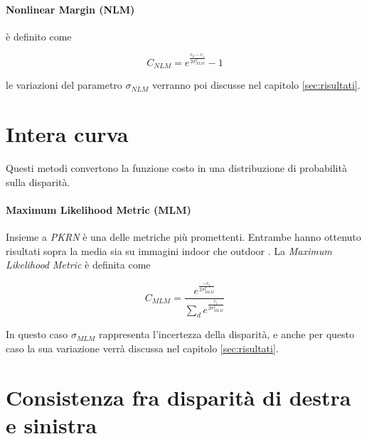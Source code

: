 \documentclass[12pt]{report}
\begin{document}
			
			\paragraph{Nonlinear Margin (NLM)}
			\label{par:NLM}
			
				è definito come
				
				\begin{equation}
					C_{NLM}= e^{ \frac{ c_{2}-c_{1}} {2\sigma_{NLM}^2}}-1
					\label{eq:NLM}
				\end{equation}
				
				\noindent le variazioni del parametro $\sigma_{NLM}$ verranno poi discusse nel capitolo \ref{sec:risultati}.
				
		\section{Intera curva}
		\label{sec:entireCost}
		
			Questi metodi convertono la funzione costo in una distribuzione di probabilità sulla disparità.
			
			\paragraph{Maximum Likelihood Metric (MLM)}
			\label{par:MLM}
			
				Insieme a \textit{PKRN} è una delle metriche più promettenti. Entrambe hanno ottenuto risultati sopra la media sia su immagini indoor che outdoor \cite{indoors_outdoors}.
				La \textit{Maximum Likelihood Metric} è definita come
				
				\begin{equation}
					C_{MLM}= \frac{e^\frac{-c_{1}}{2\sigma_{MLM}^2}}{\sum_{d} e^\frac{c_{i}}{2\sigma_{MLM}^2}}
					\label{eq:MLM}
				\end{equation}  	
			
				\noindent In questo caso $\sigma_{MLM}$ rappresenta l'incertezza della disparità, e anche per questo caso la sua variazione verrà discussa nel capitolo \ref{sec:risultati}.
		
				
		\section{Consistenza fra disparità di destra e sinistra}
		\label{sec:leftRight}
			
\end{document}
